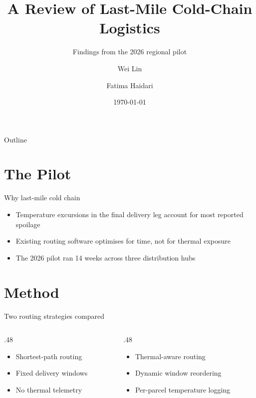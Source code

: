 \documentclass[hyperref, UTF8, aspectratio=169]{beamer}
\title[Cold-Chain Logistics Review]{A Review of Last-Mile Cold-Chain Logistics}
\subtitle{Findings from the 2026 regional pilot}
\author{Wei Lin \and Fatima Haidari}
\institute{Department of Operations Research}
\date{\today}
\begin{document}
\begin{frame}
	\titlepage
\end{frame}

\begin{frame}{Outline}
	\tableofcontents
\end{frame}

\section{The Pilot}

\begin{frame}{Why last-mile cold chain}
	\begin{itemize}
		\item Temperature excursions in the final delivery leg account for most reported spoilage
		\item Existing routing software optimises for time, not for thermal exposure
		\item The 2026 pilot ran 14 weeks across three distribution hubs
	\end{itemize}
\end{frame}

\section{Method}

\begin{frame}{Two routing strategies compared}
	\begin{columns}[onlytextwidth]
		\begin{column}{.48\textwidth}
			\begin{itemize}
				\item Shortest-path routing
				\item Fixed delivery windows
				\item No thermal telemetry
			\end{itemize}
		\end{column}
		\begin{column}{.48\textwidth}
			\begin{itemize}
				\item Thermal-aware routing
				\item Dynamic window reordering
				\item Per-parcel temperature logging
			\end{itemize}
		\end{column}
	\end{columns}
\end{frame}
\end{document}
